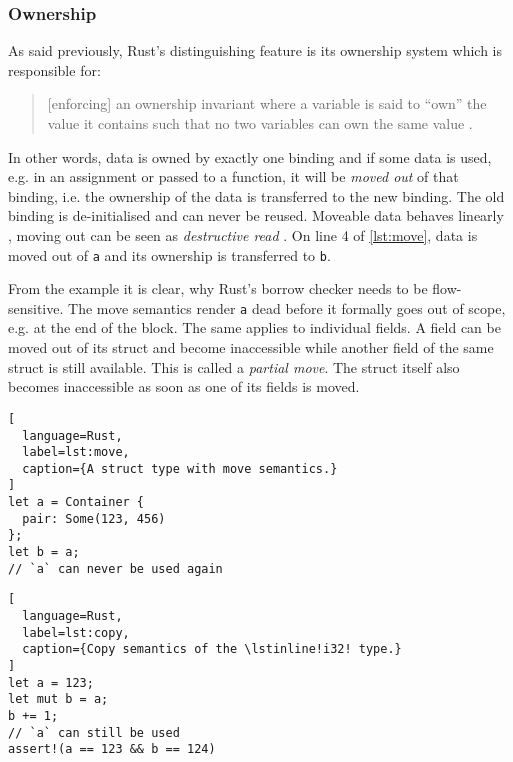 \subsubsection{Ownership}

As said previously, Rust's distinguishing feature is its ownership system which
is responsible for:

\begin{quote}
{[enforcing]} an ownership invariant where a
variable is said to ``own'' the value it contains such that no two variables can
own the same value \cite[page 5]{lightweight-formalism}.
\end{quote}

In other words, data is owned by exactly one binding and if some data is used,
e.g. in an assignment or passed to a function, it will be \emph{moved out} of
that binding, i.e. the ownership of the data is transferred to the new binding.
The old binding is de-initialised and can never be reused. Moveable data behaves
linearly \cite{oxide}, moving out can be seen as \emph{destructive read}
\cite{islands-alias-protection}. On line 4 of \autoref{lst:move}, data is moved
out of \lstinline!a! and its ownership is transferred to \lstinline!b!.

From the example it is clear, why Rust's borrow checker needs to be
flow-sensitive. The move semantics render \lstinline!a! dead before it formally
goes out of scope, e.g. at the end of the block. The same applies to individual
fields. A field can be moved out of its struct and become inaccessible while
another field of the same struct is still available. This is called a
\emph{partial move}. The struct itself also becomes inaccessible as soon as one
of its fields is moved.

\noindent\begin{minipage}[t]{.48\textwidth}
\begin{lstlisting}[
  language=Rust,
  label=lst:move,
  caption={A struct type with move semantics.}
]
let a = Container {
  pair: Some(123, 456)
};
let b = a;
// `a` can never be used again
\end{lstlisting}
\end{minipage}\hfill
\begin{minipage}[t]{.48\textwidth}
\begin{lstlisting}[
  language=Rust,
  label=lst:copy,
  caption={Copy semantics of the \lstinline!i32! type.}
]
let a = 123;
let mut b = a;
b += 1;
// `a` can still be used
assert!(a == 123 && b == 124)
\end{lstlisting}
\end{minipage}

